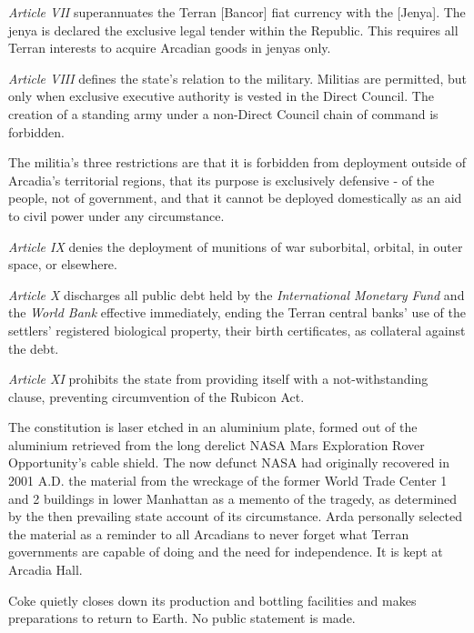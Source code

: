 \item {\it Article VII} superannuates the Terran [Bancor] fiat currency with the [Jenya]. The jenya is declared the exclusive legal tender within the Republic. This requires all Terran interests to acquire Arcadian goods in jenyas only.

\item {\it Article VIII} defines the state's relation to the military. Militias are permitted, but only when exclusive executive authority is vested in the Direct Council. The creation of a standing army under a non-Direct Council chain of command is forbidden.

The militia's three restrictions are that it is forbidden from deployment outside of Arcadia's territorial regions, that its purpose is exclusively defensive - of the people, not of government, and that it cannot be deployed domestically as an aid to civil power under any circumstance.

\item {\it Article IX} denies the deployment of munitions of war suborbital, orbital, in outer space, or elsewhere.

\item {\it Article X} discharges all public debt held by the {\it International Monetary Fund} and the {\it World Bank} effective immediately, ending the Terran central banks' use of the settlers' registered biological property, their birth certificates, as collateral against the debt.

\item {\it Article XI} prohibits the state from providing itself with a not-withstanding clause, preventing circumvention of the Rubicon Act.
\stopitemize
\stopTimelineDocument
\crlf

The constitution is laser etched in an aluminium plate, formed out of the aluminium retrieved from the long derelict NASA Mars Exploration Rover Opportunity's cable shield. The now defunct NASA had originally recovered in 2001 A.D. the material from the wreckage of the former World Trade Center 1 and 2 buildings in lower Manhattan as a memento of the tragedy, as determined by the then prevailing state account of its circumstance. Arda personally selected the material as a reminder to all Arcadians to never forget what Terran governments are capable of doing and the need for independence. It is kept at Arcadia Hall.

\StopTimelineDate

Coke quietly closes down its production and bottling facilities and makes preparations to return to Earth. No public statement is made.
\StopTimelineDate

